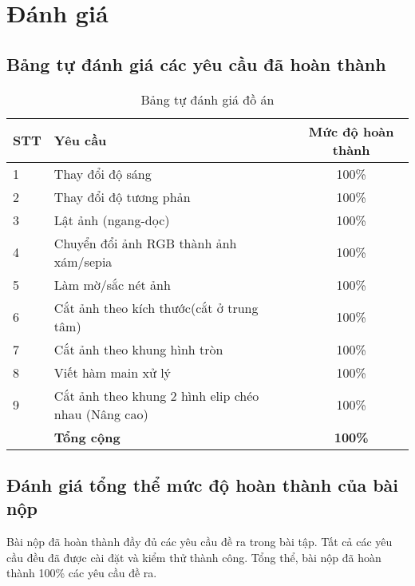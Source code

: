\section{Đánh giá}
\subsection{Bảng tự đánh giá các yêu cầu đã hoàn thành}

\begin{center}
  \begin{table}[H]
    \centering
    \caption{Bảng tự đánh giá đồ án}
    \renewcommand{\arraystretch}{1.4}
    \begin{tabular}{|l|p{}|c|}
      \hline
      \textbf{STT} & \textbf{Yêu cầu}                                                                                    & \textbf{Mức độ hoàn thành} \\ \hline
      1            & Thay đổi độ sáng                                                                                 & 100\%                      \\ \hline
      2            & Thay đổi độ tương phản                                                                          & 100\%                      \\ \hline
      3            & Lật ảnh (ngang-dọc)                                                                               & 100\%                      \\ \hline

      4            & Chuyển đổi ảnh RGB thành ảnh xám/sepia & 100\%                      \\ \hline

      5            & Làm mờ/sắc nét ảnh                                                               & 100\%                      \\ \hline
      6            & Cắt ảnh theo kích thước(cắt ở trung tâm)                                                      & 100\%                      \\ \hline
      7            & Cắt ảnh theo khung hình tròn                                    & 100\%                      \\ \hline
      8            & Viết hàm main xử lý                                           & 100\%                      \\ \hline
      9            & Cắt ảnh theo khung 2 hình elip chéo nhau (Nâng cao)                                           & 100\%                      \\ \hline
                   & \textbf{Tổng cộng}                                                                                  & \textbf{100\%}             \\ \hline
    \end{tabular}
    \label{tab:mytable}
  \end{table}
\end{center}

\subsection{Đánh giá tổng thể mức độ hoàn thành của bài nộp}

Bài nộp đã hoàn thành đầy đủ các yêu cầu đề ra trong bài tập. Tất cả các yêu cầu đều đã được cài đặt và kiểm thử thành công. Tổng thể, bài nộp đã hoàn thành 100\% các yêu cầu đề ra.
